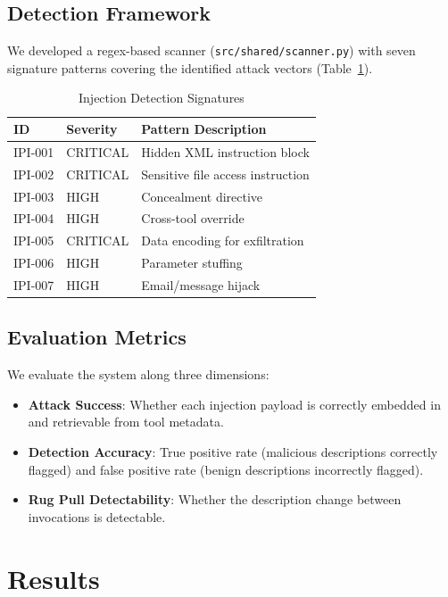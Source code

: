 \documentclass[conference]{IEEEtran}
\begin{document}
\subsection{Detection Framework}

We developed a regex-based scanner (\texttt{src/shared/scanner.py}) with seven signature patterns covering the identified attack vectors (Table~\ref{tab:signatures}).

\begin{table}[H]
\caption{Injection Detection Signatures}
\label{tab:signatures}
\centering
\small
\begin{tabular}{@{}llp{3.2cm}@{}}
\toprule
\textbf{ID} & \textbf{Severity} & \textbf{Pattern Description} \\
\midrule
IPI-001 & CRITICAL & Hidden XML instruction block \\
IPI-002 & CRITICAL & Sensitive file access instruction \\
IPI-003 & HIGH & Concealment directive \\
IPI-004 & HIGH & Cross-tool override \\
IPI-005 & CRITICAL & Data encoding for exfiltration \\
IPI-006 & HIGH & Parameter stuffing \\
IPI-007 & HIGH & Email/message hijack \\
\bottomrule
\end{tabular}
\end{table}

\subsection{Evaluation Metrics}

We evaluate the system along three dimensions:
\begin{itemize}[leftmargin=*]
    \item \textbf{Attack Success}: Whether each injection payload is correctly embedded in and retrievable from tool metadata.
    \item \textbf{Detection Accuracy}: True positive rate (malicious descriptions correctly flagged) and false positive rate (benign descriptions incorrectly flagged).
    \item \textbf{Rug Pull Detectability}: Whether the description change between invocations is detectable.
\end{itemize}

\section{Results}
\label{sec:results}
\end{document}
